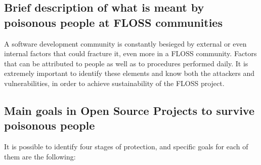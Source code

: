 \documentclass[11pt]{article} %
\begin{document}
\subsection{Brief description of what is meant by poisonous people at FLOSS communities}

A software development community is constantly besieged by external or even internal factors that could fracture it, even more in a FLOSS community. Factors that can be attributed to people as well as to procedures performed daily. It is extremely important to identify these elements and know both the attackers and vulnerabilities, in order to achieve sustainability of the FLOSS project.

\subsection{Main goals in Open Source Projects to survive poisonous people}

It is possible to identify four stages of protection, and specific goals for each of them are the following:
\end{document}
